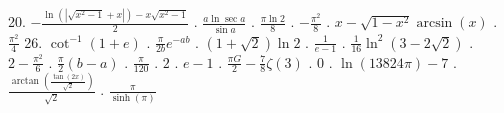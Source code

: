 20. $-\frac{\ln(|\sqrt{x^2-1}+x|)-x\sqrt{x^2-1}}{2} $ \newline {}. $\frac{a\ln{\sec{a}}}{\sin{a}}$ \newline {}. $\frac{\pi \ln{2}}{8}$ \newline {}. $-\frac{\pi^2}{8}$ \newline {}. $x-\sqrt{1-x^2}\arcsin(x)$ \newline {}. $\frac{\pi^2}{4}$ \newline \newline
\newpage
\thispagestyle{empty}
26. $\cot^{-1}(1+e)$ \newline {}. $\frac{\pi}{2b}e^{-ab}$ \newline {}. $(1+\sqrt{2})\ln{2}$ \newline {}. $\frac{1}{e-1}$ \newline {}. $\frac{1}{16}\ln^2(3-2\sqrt{2})$ \newline {}. $2-\frac{\pi^2}{6}$ \newline {}. $\frac{\pi}{2}(b-a)$ \newline {}. $\frac{\pi}{120}$ \newline {}. $2$ \newline {}. $e-1$ \newline {}. $\frac{\pi G}{2} - \frac{7}{8}\zeta(3)$ \newline {}. $0$ \newline {}. $\ln(13824\pi)-7$ \newline {}. $\frac{\arctan\left(\frac{\tan(2x)}{\sqrt{2}}\right)}{{\sqrt{2}}}$ \newline {}. $\frac{\pi}{\sinh(\pi)}$